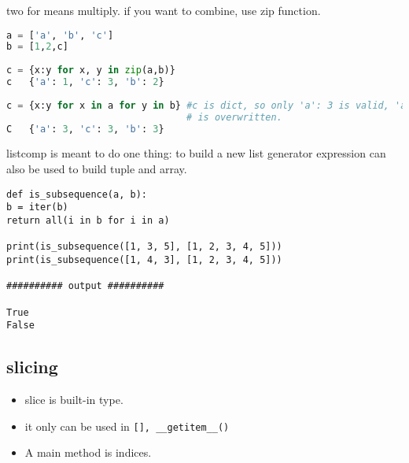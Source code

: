 \documentclass[a4paper,12pt,twoside]{book}
\begin{document}
two for means multiply. if you want to combine, use zip function. 
\begin{lstlisting}[frame=single, language=Python]	
a = ['a', 'b', 'c']
b = [1,2,c]
	
c = {x:y for x, y in zip(a,b)}
c	{'a': 1, 'c': 3, 'b': 2}
	
c = {x:y for x in a for y in b} #c is dict, so only 'a': 3 is valid, 'a':1
                                # is overwritten.
C	{'a': 3, 'c': 3, 'b': 3}
\end{lstlisting}  	
		
listcomp is meant to do one thing: to build a new list
generator expression can also be used to build tuple and array.


\begin{lstlisting}
def is_subsequence(a, b):
b = iter(b)
return all(i in b for i in a)

print(is_subsequence([1, 3, 5], [1, 2, 3, 4, 5]))
print(is_subsequence([1, 4, 3], [1, 2, 3, 4, 5]))

########## output ##########

True
False
\end{lstlisting}


\subsection{slicing}
\begin{itemize}
	\item slice is built-in type.
	\item it only can be used in \verb|[], __getitem__()|
	\item A main method is indices. 
\end{itemize}
\end{document}
